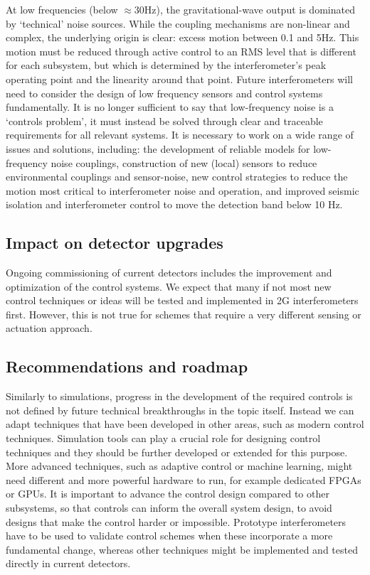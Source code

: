 \par
{}
At low frequencies (below $\approx$30Hz), the gravitational-wave output is dominated by `technical' noise sources. While the coupling mechanisms are non-linear and complex, the underlying origin is clear: excess motion between 0.1 and 5Hz. This motion must be reduced through active control to an RMS level that is different for each subsystem, but which is determined by the interferometer's peak operating point and the linearity around that point.
Future interferometers will need to consider the design of low frequency sensors and control systems fundamentally. It is no longer sufficient to say that low-frequency noise is a `controls problem', it must instead be solved through clear and traceable requirements for all relevant systems. 
It is necessary to work on a wide range of issues and solutions, including: the development of reliable models for low-frequency noise couplings, construction of new (local) sensors 
to reduce environmental couplings and sensor-noise, new control strategies to reduce the motion most critical to interferometer noise and operation, and improved seismic isolation and interferometer control to move the detection band below 10 Hz.

\subsection{Impact on detector upgrades}
Ongoing commissioning of current detectors includes the improvement and optimization of the control systems. We expect that many if not most new control techniques or ideas will be tested and implemented in 2G interferometers first. However, this is not true for schemes that require a very different sensing or actuation approach.

\subsection{Recommendations and roadmap}
Similarly to simulations, progress in the development of the required controls is not defined by future technical breakthroughs in the topic itself. Instead we can adapt techniques that have been developed in other areas, such as modern control techniques. Simulation tools can play a crucial role for designing control techniques and they should be further developed or extended for this purpose.
More advanced techniques, such as adaptive control or machine learning, might need different and more powerful hardware to run, for example dedicated FPGAs or GPUs. 
It is important to advance the control design compared to other subsystems, so that controls can inform the overall system design, 
to avoid designs that make the control harder or impossible. Prototype interferometers have to be used
to validate control schemes when these incorporate a more fundamental change, whereas other techniques might be implemented and tested directly in current detectors.

